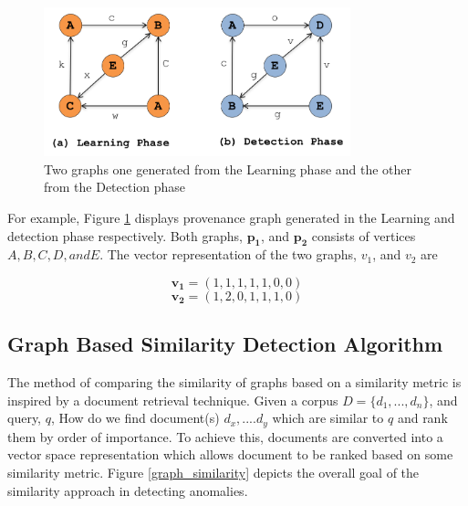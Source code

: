 \begin{figure}[h!]
\begin{center}
\includegraphics[height=1.7in, width=3.5in]{graph_sim.png}
\end{center}
\caption{Two graphs one generated from the Learning phase and the other from the Detection phase}
\label{example}
\end{figure}


For example, Figure \ref{example} displays provenance graph generated in the Learning and detection phase respectively. Both graphs, $\boldsymbol{p_1}$, and $\boldsymbol{p_2}$ consists of vertices $A,B,C,D, and E$.  The vector representation of the two graphs, $v_1$, and $v_2$ are 

\[ \boldsymbol{v_1} = (1,1,1,1,1,0,0) \] \[\boldsymbol{v_2} = (1,2,0,1,1,1,0) \]









\subsection{Graph Based Similarity Detection Algorithm}


The method of comparing the similarity of graphs based on a similarity metric is inspired by a document retrieval technique. Given a corpus $D = \{ d_1,..., d_n\}$, and query, $q$,  How do we find document(s) ${d_x,....d_y}$ which are similar to $q$ and rank them by order of importance. To achieve this, documents are converted into a vector space representation which allows document to be ranked based on some similarity metric. Figure \ref{graph_similarity} depicts the overall goal of the similarity approach in detecting anomalies.


